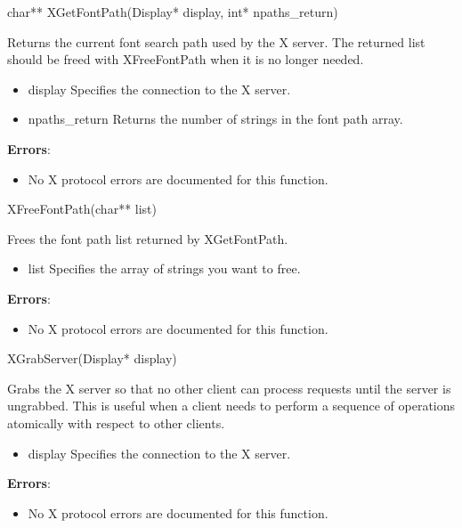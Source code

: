 \documentclass{report}
\begin{document}
\begin{itemize}
        \begin{cppcode}
        char** XGetFontPath(Display* display, int* npaths_return)
        \end{cppcode}
        \bigbreak \noindent
        Returns the current font search path used by the X server. The returned list should be freed with XFreeFontPath when it is no longer needed.
        \begin{itemize}
            \item display Specifies the connection to the X server.
            \item npaths\_return Returns the number of strings in the font path array.
        \end{itemize}
        \bigbreak \noindent
        \textbf{Errors}:
        \begin{itemize}
            \item No X protocol errors are documented for this function.
        \end{itemize}

        \begin{cppcode}
        XFreeFontPath(char** list)
        \end{cppcode}
        \bigbreak \noindent
        Frees the font path list returned by XGetFontPath.
        \begin{itemize}
            \item list Specifies the array of strings you want to free.
        \end{itemize}
        \bigbreak \noindent
        \textbf{Errors}:
        \begin{itemize}
            \item No X protocol errors are documented for this function.
        \end{itemize}

        \begin{cppcode}
            XGrabServer(Display* display)
        \end{cppcode}
        \bigbreak \noindent
        Grabs the X server so that no other client can process requests until the server is ungrabbed. This is useful when a client needs to perform a sequence of operations atomically with respect to other clients.
        \begin{itemize}
            \item display Specifies the connection to the X server.
        \end{itemize}
        \bigbreak \noindent
        \textbf{Errors}:
        \begin{itemize}
            \item No X protocol errors are documented for this function.
        \end{itemize}


\end{itemize}
\end{document}
